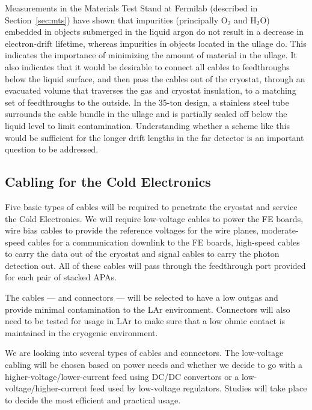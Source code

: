 Measurements in the Materials Test Stand at Fermilab (described in Section~\ref{sec:mts})
have shown that impurities (principally O$_2$ and H$_2$O) embedded in objects submerged in the liquid argon do not result
in a decrease in electron-drift lifetime, whereas impurities in objects located in the ullage do.
This indicates the importance of minimizing the amount of material in the ullage.
It also indicates that it would be desirable to connect all cables to feedthroughs below the liquid surface,
and then pass the cables out of the cryostat, through an evacuated volume that traverses the gas and cryostat insulation,
to a matching set of feedthroughs to the outside.
In the 35-ton design, a stainless steel tube surrounds the cable bundle in the ullage and is partially sealed off below the
liquid level to limit contamination.
Understanding whether a scheme like this would be sufficient for the longer drift lengths in the far detector
is an important question to be addressed.

%
\subsection{Cabling for the Cold Electronics }
\label{subsec:ce_feedthrough_cable}

Five basic types of cables will be required to penetrate the cryostat and service the Cold Electronics.
We will require low-voltage cables to power the FE boards,
wire bias cables to provide the reference voltages for the wire planes,
moderate-speed cables for a communication downlink to the FE boards,
high-speed cables to carry the data out of the cryostat and signal cables to carry the photon detection out.
All of these cables will pass through the feedthrough port provided for each pair of stacked APAs.

The cables --- and connectors --- will be selected to have a low outgas and provide minimal contamination to the LAr environment.
Connectors will also need to be tested for usage in LAr to make sure that a low ohmic contact is maintained
in the cryogenic environment.

We are looking into several types of cables and connectors.
The low-voltage cabling will be %
chosen based on power needs and whether we decide to go with a higher-voltage/lower-current
feed using DC/DC convertors or a low-voltage/higher-current feed used by low-voltage regulators.
Studies will take place to decide the most efficient and practical usage.

